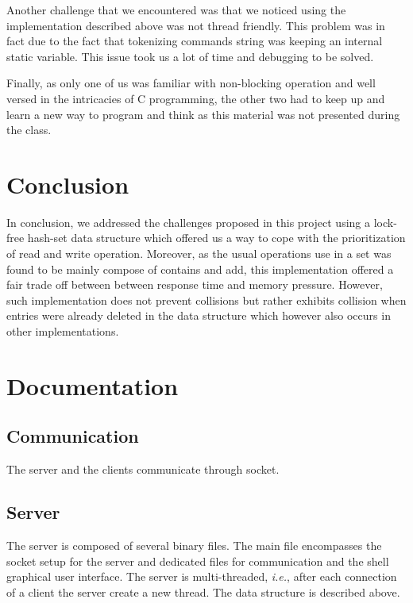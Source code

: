 \documentclass[a4paper,11pt]{report}
\begin{document}
    Another challenge that we encountered was that we noticed using the implementation described above was not
    thread friendly.
    This problem was in fact due to the fact that tokenizing commands string was keeping an internal static variable.
    This issue took us a lot of time and debugging to be solved.

    Finally, as only one of us was familiar with non-blocking operation and well versed in the intricacies of C programming,
    the other two had to keep up and learn a new way to program and think as this material was not presented
    during the class.

    \section*{Conclusion}
    In conclusion, we addressed the challenges proposed in this project using a lock-free hash-set data structure which
    offered us a way to cope with the prioritization of read and write operation. Moreover, as the usual operations use
    in a set was found to be mainly compose of contains and add, this implementation offered a fair trade off between
    between response time and memory pressure. However, such implementation does not prevent collisions but rather
    exhibits collision when entries were already deleted in the data structure which however also occurs in other implementations.


    \printbibliography

    \newpage

    \section*{Documentation}

    \subsection*{Communication}
    The server and the clients communicate through socket.

    \subsection*{Server}
    The server is composed of several binary files.
    The main file encompasses the socket setup for the server and dedicated files for communication and the shell
    graphical user interface.
    The server is multi-threaded, \textit{i.e.}, after each connection of a client the server create a new thread.
    The data structure is described above.
\end{document}
